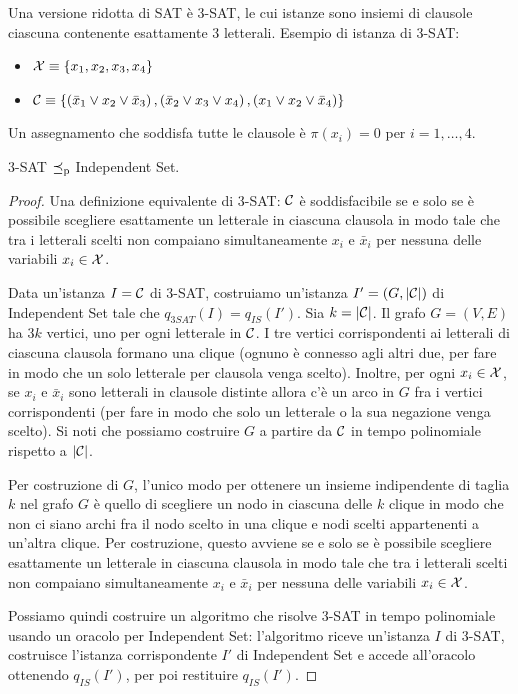Una versione ridotta di SAT è \textsc{3-SAT}, le cui istanze sono insiemi di clausole ciascuna contenente esattamente 3 letterali. Esempio di istanza di 3-SAT:
\begin{itemize}
    \item $\mathcal{X} \equiv \left\{x_1, x_2, x_3, x_4\right\}$

    \item $\mathcal{C} \equiv \left\{\left(\bar x_1 \vee x_2 \vee \bar x_3 \right), \left(\bar x_2 \vee x_3 \vee x_4 \right), \left(x_1 \vee x_2 \vee \bar x_4 \right) \right\}$
\end{itemize}
Un assegnamento che soddisfa tutte le clausole è $\pi(x_i) = 0$ per $i = 1, \dots, 4$. \\

\begin{theorem}
    3-SAT $\preceq_\text{p}$ Independent Set.
\end{theorem}
\begin{proof}
    Una definizione equivalente di 3-SAT: $\mathcal{C}$ è soddisfacibile se e solo se è possibile scegliere esattamente un letterale in ciascuna clausola in modo tale che tra i letterali scelti non compaiano simultaneamente $x_i$ e $\bar x_i$ per nessuna delle variabili $x_i \in \mathcal{X}$.

    Data un'istanza $I = \mathcal{C}$ di 3-SAT, costruiamo un'istanza $I' = \left(G, |\mathcal{C}|\right)$ di Independent Set tale che $q_{3SAT} (I) = q_{IS} (I')$. Sia $k = |\mathcal{C}|$. Il grafo $G = (V,E)$ ha $3k$ vertici, uno per ogni letterale in $\mathcal{C}$. I tre vertici corrispondenti ai letterali di ciascuna clausola formano una clique (ognuno è connesso agli altri due, per fare in modo che un solo letterale per clausola venga scelto). Inoltre, per ogni $x_i \in \mathcal{X}$, se $x_i$ e $\bar x_i$ sono letterali in clausole distinte allora c'è un arco in $G$ fra i vertici corrispondenti (per fare in modo che solo un letterale o la sua negazione venga scelto). Si noti che possiamo costruire $G$ a partire da $\mathcal{C}$ in tempo polinomiale rispetto a $|\mathcal{C}|$.

    Per costruzione di $G$, l'unico modo per ottenere un insieme indipendente di taglia $k$ nel grafo $G$ è quello di scegliere un nodo in ciascuna delle $k$ clique in modo che non ci siano archi fra il nodo scelto in una clique e nodi scelti appartenenti a un'altra clique. Per costruzione, questo avviene se e solo se è possibile scegliere esattamente un letterale in ciascuna clausola in modo tale che tra i letterali scelti non compaiano simultaneamente $x_i$ e $\bar x_i$ per nessuna delle variabili $x_i \in \mathcal{X}$.

    Possiamo quindi costruire un algoritmo che risolve 3-SAT in tempo polinomiale usando un oracolo per Independent Set: l'algoritmo riceve un'istanza $I$ di 3-SAT, costruisce l'istanza corrispondente $I'$ di Independent Set e accede all'oracolo ottenendo $q_{IS} (I')$, per poi restituire $q_{IS} (I')$.
\end{proof}